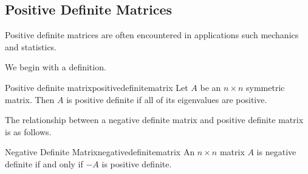 \subsection{Positive Definite Matrices}

Positive definite matrices are often encountered in applications such mechanics and statistics.

We begin with a definition.

\begin{definition}{Positive definite matrix}{positivedefinitematrix}
Let $A$ be an $n \times n$ symmetric matrix. Then $A$ is positive definite if all of its eigenvalues are positive.
\end{definition}

The relationship between a negative definite matrix and positive definite matrix is as follows. 

\begin{lemma}{Negative Definite Matrix}{negativedefinitematrix}
An $n\times n$ matrix $A$ is negative definite if and only if $-A$ is
positive definite.
\end{lemma}


